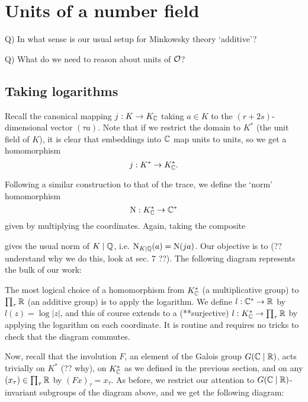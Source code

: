 \section{Units of a number field}

Q) In what sense is our usual setup for Minkowsky theory `additive'?

Q) What do we need to reason about units of $\mathcal{O}$?

\subsection{Taking logarithms}

Recall the canonical mapping $j:K\to K_{\mathbb{C}}$ taking $a\in K$ to the $(r+2s)$-dimensional vector $(\tau a)$. Note that if we restrict the domain to $K^*$ (the unit field of $K$), it is clear that embeddings into $\mathbb{C}$ map units to units, so we get a homomorphism
\[
	j : K^* \to K^*_{\mathbb{C}}.
\]

Following a similar construction to that of the trace, we define the `norm' homomorphism
\[
	\operatorname{N} : K^*_{\mathbb{C}} \to \mathbb{C}^*
\]
given by multiplying the coordinates. Again, taking the composite
\begin{center}
\end{center}
gives the usual norm of $K\mid\mathbb{Q}$, i.e. $\operatorname{N}_{K\mid\mathbb{Q}}(a)=\operatorname{N}(ja)$. Our objective is to (?? understand why we do this, look at sec. 7 ??). The following diagram represents the bulk of our work:
\begin{center}
\end{center}

The most logical choice of a homomorphism from $K^*_{\mathbb{C}}$ (a multiplicative group) to $\prod_\tau\mathbb{R}$ (an additive group) is to apply the logarithm. We define $l:\mathbb{C}^*\to\mathbb{R}$ by $l(z)=\log|z|$, and this of course extends to a (**surjective) $l:K^*_{\mathbb{C}}\to\prod_\tau\mathbb{R}$ by applying the logarithm on each coordinate. It is routine and requires no tricks to check that the diagram commutes.

Now, recall that the involution $F$, an element of the Galois group $G(\mathbb{C}\mid\mathbb{R})$, acts trivially on $K^*$ (?? why), on $K^*_{\mathbb{C}}$ as we defined in the previous section, and on any $(x_\tau)\in\prod_\tau\mathbb{R}$ by $(Fx)_\tau = x_{\overline{\tau}}$. As before, we restrict our attention to $G(\mathbb{C}\mid\mathbb{R})$-invariant subgroups of the diagram above, and we get the following diagram:

